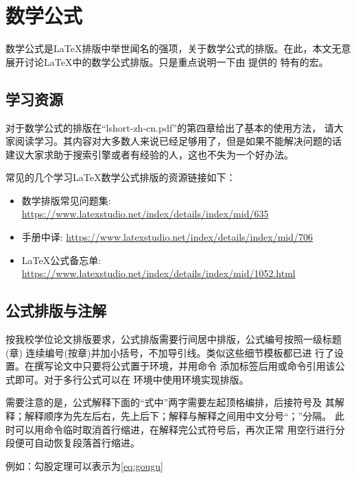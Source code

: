 \chapter{数学公式}

数学公式是\LaTeX{}排版中举世闻名的强项，关于数学公式的排版。在此，本文无意
展开讨论\LaTeX{}中的数学公式排版。只是重点说明一下由 \nwafuthesis{} 提供的
特有的宏。

\section{学习资源}

对于数学公式的排版在\enquote{lshort-zh-cn.pdf}的第四章给出了基本的使用方法，
请大家阅读学习。其内容对大多数人来说已经足够用了，但是如果不能解决问题的话
建议大家求助于搜索引擎或者有经验的人，这也不失为一个好办法。

常见的几个学习\LaTeX{}数学公式排版的资源链接如下：

\begin{itemize}
  \item 数学排版常见问题集:
        \url{https://www.latexstudio.net/index/details/index/mid/635}
  \item {}手册中译:
        \url{https://www.latexstudio.net/index/details/index/mid/706}
  \item \LaTeX{}公式备忘单:
        \url{https://www.latexstudio.net/index/details/index/mid/1052.html}
\end{itemize}

\section{公式排版与注解}

按我校学位论文排版要求，公式排版需要行间居中排版，公式编号按照一级标题(章)
连续编号(按章)并加小括号，不加导引线。类似这些细节\nwafuthesis{}模板都已进
行了设置。在撰写论文中只要将公式置于环境，并用命令
添加标签后用或命令引用该公式即可。对于多行公式可以在
环境中使用环境实现排版。

需要注意的是，公式解释下面的\enquote{式中}两字需要左起顶格编排，后接符号及
其解释；解释顺序为先左后右，先上后下；解释与解释之间用中文分号“；”分隔。
此时可以用命令临时取消首行缩进，在解释完公式符号后，再次正常
用空行进行分段便可自动恢复段落首行缩进。

例如：勾股定理可以表示为\ref{eq:gougu}

